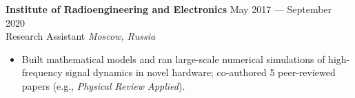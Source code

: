 \documentclass[11pt,a4paper]{article}
\begin{document}
\noindent\textbf{Institute of Radioengineering and Electronics} \hfill May 2017 --- September 2020\\
Research Assistant \hfill \textit{Moscow, Russia}\\
[-2em]
\begin{itemize}[leftmargin=*,noitemsep]
    \item Built mathematical models and ran large-scale numerical simulations of high-frequency signal dynamics in novel hardware; co-authored 5 peer-reviewed papers (e.g., \textit{Physical Review Applied}).
\end{itemize}
\end{document}
